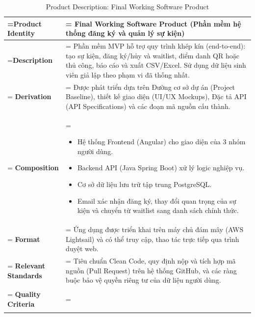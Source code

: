 \clearpage
\begin{table}[H]
    \centering
    \caption{Product Description: Final Working Software Product}
    \renewcommand{\arraystretch}{1.5}
    \begin{tabularx}{\textwidth}{|>{\hsize=0.5\hsize\linewidth=\hsize\bfseries}X|>{\hsize=1.5\hsize\linewidth=\hsize}X|}
        \hline
        Product Identity & \textbf{Final Working Software Product} (Phần mềm hệ thống đăng ký và quản lý sự kiện) \\
        \hline
        Description & Phần mềm MVP hỗ trợ quy trình khép kín (end-to-end): tạo sự kiện, đăng ký/hủy và waitlist, điểm danh QR hoặc thủ công, báo cáo và xuất CSV/Excel. Sử dụng dữ liệu sinh viên giả lập theo phạm vi đã thống nhất. \\
        \hline
        Derivation & Được phát triển dựa trên Đường cơ sở dự án (Project Baseline), thiết kế giao diện (UI/UX Mockups), Đặc tả API (API Specifications) và các đoạn mã nguồn cấu thành. \\
        \hline
        Composition & 
        \vspace{-0.8em}
        \begin{itemize}[leftmargin=*, nosep]
            \item Hệ thống Frontend (Angular) cho giao diện của 3 nhóm người dùng.
            \item Backend API (Java Spring Boot) xử lý logic nghiệp vụ.
            \item Cơ sở dữ liệu lưu trữ tập trung PostgreSQL.
            \item Email xác nhận đăng ký, thay đổi quan trọng của sự kiện và chuyển từ waitlist sang danh sách chính thức.
        \end{itemize}
        \vspace{-1em} \\
        \hline
        Format & Ứng dụng được triển khai trên máy chủ đám mây (AWS Lightsail) và có thể truy cập, thao tác trực tiếp qua trình duyệt web. \\
        \hline
        Relevant Standards & Tiêu chuẩn Clean Code, quy định nộp và tích hợp mã nguồn (Pull Request) trên hệ thống GitHub, và các ràng buộc bảo vệ quyền riêng tư của dữ liệu người dùng. \\
        \hline
        Quality Criteria & 
        \vspace{-0.8em}
        \begin{itemize}[leftmargin=*, nosep]

\end{itemize}
\end{tabularx}
\end{table}
